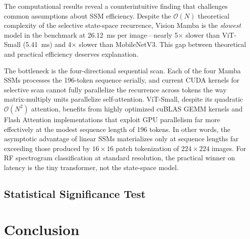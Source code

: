 \documentclass[runningheads]{llncs}
\begin{document}
The computational results reveal a counterintuitive finding that challenges common assumptions about SSM efficiency. Despite the $\mathcal{O}(N)$ theoretical complexity of the selective state-space recurrence, Vision Mamba is the \emph{slowest} model in the benchmark at 26.12~ms per image---nearly 5$\times$ slower than ViT-Small (5.41~ms) and 4$\times$ slower than MobileNetV3. This gap between theoretical and practical efficiency deserves explanation.

The bottleneck is the four-directional sequential scan. Each of the four Mamba SSMs processes the 196-token sequence serially, and current CUDA kernels for selective scan cannot fully parallelize the recurrence across tokens the way matrix-multiply units parallelize self-attention. ViT-Small, despite its quadratic $\mathcal{O}(N^2)$ attention, benefits from highly optimized cuBLAS GEMM kernels and Flash Attention implementations that exploit GPU parallelism far more effectively at the modest sequence length of 196 tokens. In other words, the asymptotic advantage of linear SSMs materializes only at sequence lengths far exceeding those produced by $16 \times 16$ patch tokenization of $224 \times 224$ images. For RF spectrogram classification at standard resolution, the practical winner on latency is the tiny transformer, not the state-space model.


\subsection{Statistical Significance Test}


\section{Conclusion}
\end{document}
